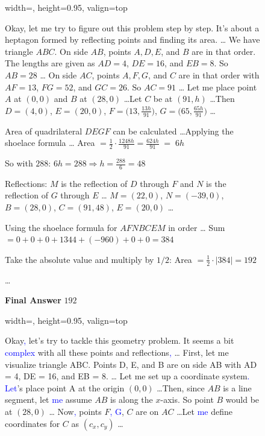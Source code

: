 \begin{figure}[t]
\centering
\begin{minipage}[t]{0.32\textwidth}
\begin{bluebox}{width=\linewidth, height=0.95\textheight, valign=top}

Okay, let me try to figure out this problem step by step. It's about a heptagon formed by reflecting points and finding its area. \ldots
We have triangle $ABC$. On side $AB$, points $A, D, E$, and $B$ are in that order. The lengths are given as $AD = 4$, $DE = 16$, and $EB = 8$. So $AB = 28$ \ldots
On side $AC$, points $A, F, G$, and $C$ are in that order with $AF = 13$, $FG = 52$, and $GC = 26$. So $AC = 91$ \ldots
Let me place point $A$ at $(0,0)$ and $B$ at $(28,0)$ \ldots Let $C$ be at $(91, h)$ \ldots Then
$D=(4,0)$, $E=(20,0)$, $F=\big(13,\frac{13h}{91}\big)$, $G=\big(65,\frac{65h}{91}\big)$ \ldots

Area of quadrilateral $DEGF$ can be calculated \ldots Applying the shoelace formula \ldots
Area $= \frac{1}{2}\cdot \frac{1248h}{91} = \frac{624h}{91} \;\mathbf{=}\; 6h$

So with $288$:
$6h = 288 \Rightarrow h = \frac{288}{6} = 48$

Reflections: $M$ is the reflection of $D$ through $F$ and $N$ is the reflection of $G$ through $E$ \ldots
$M=(22,0)$, $N=(-39,0)$, $B=(28,0)$, $C=(91,48)$, $E=(20,0)$ \ldots

Using the shoelace formula for $AFNBCEM$ in order \ldots
Sum $= 0 + 0 + 0 + 1344 + (-960) + 0 + 0 = 384$

Take the absolute value and multiply by $1/2$: Area $= \frac{1}{2}\cdot |384| = 192$

\ldots

\textbf{Final Answer} $\boxed{192}$ \xmark

\end{bluebox}
\end{minipage}\hfill
\begin{minipage}[t]{0.32\textwidth}
\begin{bluebox}{width=\linewidth,  
height=0.95\textheight,  valign=top}


Okay\textcolor{blue}{,} let's try to tackle this geometry problem. It seems a bit \textcolor{blue}{ complex} with all these points and reflections\textcolor{blue}{,} \ldots
First, let me visualize triangle ABC. Points D, E, and B are on side AB with AD = 4, DE = 16, and EB = 8. \ldots
Let me set up a coordinate system\textcolor{blue}{. Let}'s place point A at the origin $(0, 0)$ \ldots Then, since $AB$ is a line segment, let \textcolor{blue}{ me} assume $AB$ is along the $x$-axis. So point $B$ would be at $(28, 0)$ \ldots
Now\textcolor{blue}{,} points $F$\textcolor{blue}{, G}, $C$ are on $AC$ \ldots Let \textcolor{blue}{me} define coordinates for $C$ as $(c_x, c_y)$ \ldots


\end{bluebox}
\end{minipage}
\end{figure}
